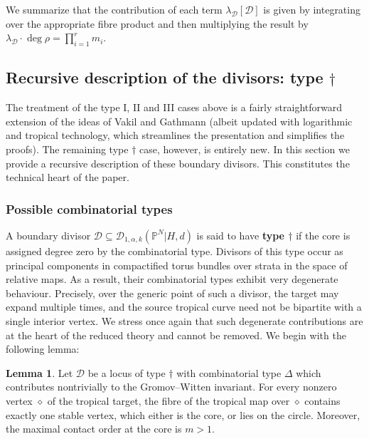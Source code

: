 \documentclass[11pt]{amsart}
\newcommand{\PP}{\mathbb P}
\newcommand{\Dcal}{\mathcal{D}}
\theoremstyle{definition}
\newtheorem{lemma}[thm]{Lemma}
\theoremstyle{definition}
\begin{document}
We summarize that the contribution of each term $\lambda_\Dcal [\Dcal]$ is given by integrating over the appropriate fibre product and then multiplying the result by $\lambda_\Dcal \cdot \deg\rho = \prod_{i=1}^r m_i$.

\subsection{Recursive description of the divisors: type $\dag$}\label{subsection C0 splitting} The treatment of the type I, II and III cases above is a fairly straightforward extension of the ideas of Vakil and Gathmann (albeit updated with logarithmic and tropical technology, which streamlines the presentation and simplifies the proofs). The remaining type $\dag$ case, however, is entirely new. In this section we provide a recursive description of these boundary divisors. This constitutes the technical heart of the paper.

\subsubsection{Possible combinatorial types} A boundary divisor $\Dcal \subseteq \Dcal_{1,\alpha,k}(\PP^N|H,d)$ is said to have \textbf{type $\dag$} if the core is assigned degree zero by the combinatorial type. Divisors of this type occur as principal components in compactified torus bundles over strata in the space of relative maps. As a result, their combinatorial types exhibit very degenerate behaviour. Precisely, over the generic point of such a divisor, the target may expand multiple times, and the source tropical curve need not be bipartite with a single interior vertex. We stress once again that such degenerate contributions are at the heart of the reduced theory and cannot be removed.  We begin with the following lemma:
\begin{lemma} \label{lemma type C0 combinatorial types}
Let $\Dcal$ be a locus of type $\dag$ with combinatorial type $\Delta$ which contributes nontrivially to the Gromov--Witten invariant. For every nonzero vertex $\diamond$ of the tropical target, the fibre of the tropical map over $\diamond$ contains exactly one stable vertex, which either is the core, or lies on the circle. Moreover, the maximal contact order at the core is $m>1$.
\end{lemma}
\end{document}
